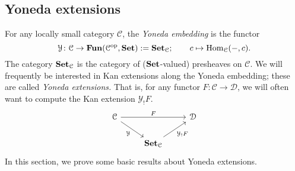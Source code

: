 \documentclass[main.tex]{subfiles}
\begin{document}
\subsection{Yoneda extensions}
\label{ssc:yoneda_extensions}

For any locally small category $\mathcal{C}$, the \emph{Yoneda embedding} is the functor
\begin{equation*}
  \mathcal{Y}\colon \mathcal{C} \to \operatorname{\mathbf{Fun}}(\mathcal{C}^{\mathrm{op}}, \mathbf{Set}) := \mathbf{Set}_{\mathcal{C}};\qquad c \mapsto \operatorname{Hom}_{\mathcal{C}}(-, c).
\end{equation*}
The category $\mathbf{Set}_{\mathcal{C}}$ is the category of ($\mathbf{Set}$-valued) presheaves on $\mathcal{C}$. We will frequently be interested in Kan extensions along the Yoneda embedding; these are called \emph{Yoneda extensions.} That is, for any functor $F\colon \mathcal{C} \to \mathcal{D}$, we will often want to compute the Kan extension $\mathcal{Y}_{!}F$.
\begin{equation*}
  \begin{tikzcd}
    \mathcal{C}
    \arrow[rr, "F"]
    \arrow[dr, swap, "\mathcal{Y}"]
    && \mathcal{D}
    \\
    & \Set_{\mathcal{C}}
    \arrow[ur, swap, "\mathcal{Y}_{!}F"]
  \end{tikzcd}
\end{equation*}
In this section, we prove some basic results about Yoneda extensions.

\end{document}

